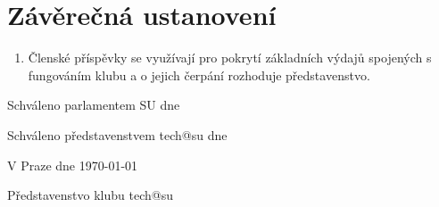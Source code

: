 \documentclass[10pt]{article}
\begin{document}
\section{Závěrečná ustanovení}
	\begin{enumerate}
		\item Členské příspěvky se využívají pro pokrytí základních výdajů spojených s fungováním klubu a o jejich čerpání rozhoduje představenstvo.
	\end{enumerate}

	

\vspace{10mm}
Schváleno parlamentem SU dne

Schváleno představenstvem tech@su dne

\vspace{30mm}

\hfill V Praze dne \today

\hfill Představenstvo klubu tech@su
\end{document}
